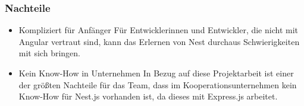 \subsubsection{Nachteile}
\begin{itemize}
    \item Kompliziert für Anfänger
    \newline
    Für Entwicklerinnen und Entwickler, die nicht mit Angular vertraut sind, kann das Erlernen von Nest durchaus Schwierigkeiten mit sich bringen.
    \item Kein Know-How in Unternehmen
    \newline
    In Bezug auf diese Projektarbeit ist einer der größten Nachteile für das Team, dass im Kooperationsunternehmen kein Know-How für Nest.js vorhanden ist, da dieses mit Express.js arbeitet.
\end{itemize}
\cite{Nest_js_Pros_Cons}

